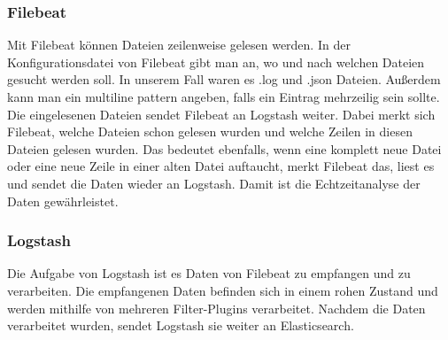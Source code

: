 \subsubsection{Filebeat}
\label{ssub:Filebeat}
Mit Filebeat können Dateien zeilenweise gelesen werden. In der Konfigurationsdatei von Filebeat gibt man an, wo und nach welchen Dateien gesucht werden soll. In unserem Fall waren es .log und .json Dateien. Außerdem kann man ein multiline pattern angeben, falls ein Eintrag mehrzeilig sein sollte. Die eingelesenen Dateien sendet Filebeat an Logstash weiter. Dabei merkt sich Filebeat, welche Dateien schon gelesen wurden und welche Zeilen in diesen Dateien gelesen wurden. Das bedeutet ebenfalls, wenn eine komplett neue Datei oder eine neue Zeile in einer alten Datei auftaucht, merkt Filebeat das, liest es und sendet die Daten wieder an Logstash. Damit ist die Echtzeitanalyse der Daten gewährleistet. 

\subsubsection{Logstash}
\label{sub:Logstash}
Die Aufgabe von Logstash ist es Daten von Filebeat zu empfangen und zu verarbeiten. Die empfangenen Daten befinden sich in einem rohen Zustand und werden mithilfe von mehreren Filter-Plugins verarbeitet. Nachdem die Daten verarbeitet wurden, sendet Logstash sie weiter an Elasticsearch.\\

